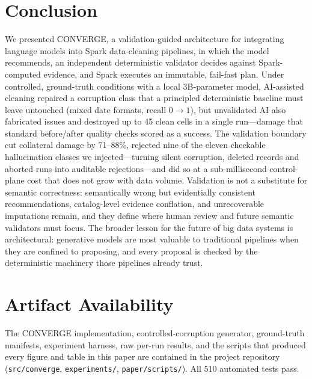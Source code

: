 \section{Conclusion}
\label{sec:conclusion}
We presented CONVERGE, a validation-guided architecture for integrating language models into Spark data-cleaning pipelines, in which the model recommends, an independent deterministic validator decides against Spark-computed evidence, and Spark executes an immutable, fail-fast plan. Under controlled, ground-truth conditions with a local 3B-parameter model, AI-assisted cleaning repaired a corruption class that a principled deterministic baseline must leave untouched (mixed date formats, recall $0\to1$), but unvalidated AI also fabricated issues and destroyed up to 45 clean cells in a single run---damage that standard before/after quality checks scored as a success. The validation boundary cut collateral damage by 71--88\%, rejected nine of the eleven checkable hallucination classes we injected---turning silent corruption, deleted records and aborted runs into auditable rejections---and did so at a sub-millisecond control-plane cost that does not grow with data volume. Validation is not a substitute for semantic correctness: semantically wrong but evidentially consistent recommendations, catalog-level evidence conflation, and unrecoverable imputations remain, and they define where human review and future semantic validators must focus. The broader lesson for the future of big data systems is architectural: generative models are most valuable to traditional pipelines when they are confined to proposing, and every proposal is checked by the deterministic machinery those pipelines already trust.

\section*{Artifact Availability}
The CONVERGE implementation, controlled-corruption generator, ground-truth manifests, experiment harness, raw per-run results, and the scripts that produced every figure and table in this paper are contained in the project repository (\texttt{src/converge}, \texttt{experiments/}, \texttt{paper/scripts/}). All 510 automated tests pass.
